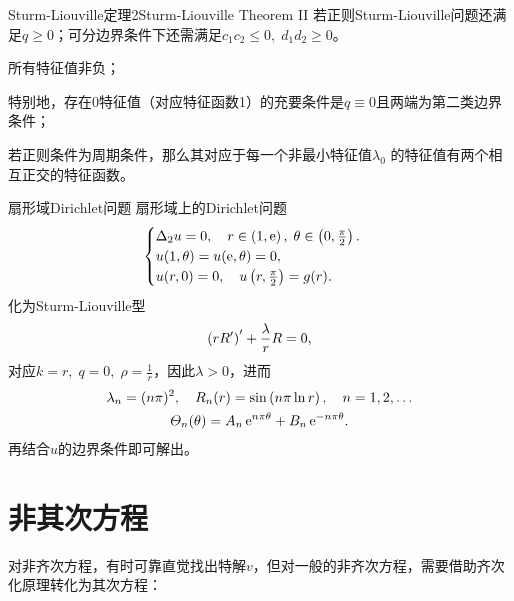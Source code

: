 \begin{theorem}{Sturm-Liouville定理2}{Sturm-Liouville Theorem II}
	若正则Sturm-Liouville问题还满足$q\geqslant 0$；可分边界条件下还需满足$c_1c_2\leqslant 0,\;d_1d_2\geqslant 0$。
	\begin{compactenum}
		\item 所有特征值非负；

		      特别地，存在0特征值（对应特征函数1）的充要条件是$q\equiv 0$且两端为第二类边界条件；
		\item 若正则条件为周期条件，那么其对应于每一个非最小特征值$\lambda_0$
		的特征值有两个相互正交的特征函数。
	\end{compactenum}
\end{theorem}
\begin{example}{扇形域Dirichlet问题}{}
	扇形域上的Dirichlet问题
	\begin{align*}
		\begin{cases}
			\Delta_2u=0,\quad r\in\left(1,\mathrm e\right),\;\theta\in\left(0,\frac\pi{2}\right).\\
			u(1,\theta)=u(\mathrm e,\theta)=0,\\
			u(r,0)=0,\quad u\left(r,\frac\pi{2}\right)=g(r).
		\end{cases}
	\end{align*}
	化为Sturm-Liouville型
	\[
		\left(rR'\right)'+\frac{\lambda}rR=0,
	\]
	对应\(k=r,\;q=0,\;\rho=\frac1r\)，因此\(\lambda>0\)，进而
	\begin{gather*}
		\lambda_n=(n\pi)^2,\quad R_n(r)=\sin\left(n\pi\ln r\right),\quad n=1,2,\ldots
		\\
		\varTheta_n(\theta)=A_n\mathop{}\!\mathrm{e}^{n\pi\theta}+B_n\mathop{}\!\mathrm{e}^{-n\pi\theta}.
	\end{gather*}
	再结合$u$的边界条件即可解出。
\end{example}

\section{非其次方程}

对非齐次方程，有时可靠直觉找出特解$v$，但对一般的非齐次方程，需要借助齐次化原理转化为其次方程：

